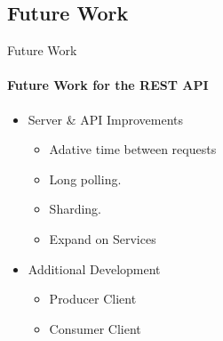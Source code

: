     \subsection{Future Work}
    \begin{frame}{Future Work}\framesubtitle{Future Work for the REST API}
        \begin{itemize}
            \item Server \& API Improvements
            \begin{itemize}
                    \item Adative time between requests
                    \item Long polling.
                    \item Sharding. %
                    \item Expand on Services
            \end{itemize}
            \item Additional Development
            \begin{itemize}
                    \item Producer Client
                    \item Consumer Client
            \end{itemize}
        \end{itemize}
    \end{frame}
